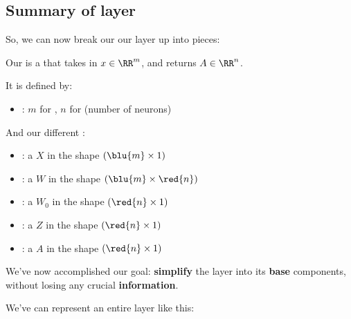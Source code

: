     \subsection{Summary of layer}
    
        So, we can now break our our layer up into pieces:\\
        
        \begin{notation}
            Our  is a  that takes in $x \in \RR^m$, and returns $A \in \RR^n$.
            
            It is defined by:
            
            \begin{itemize}
                \item {}: $m$ for , $n$ for  (number of neurons)
            \end{itemize}
            
            And our different :
            
            \begin{itemize}
                \item {}: a  $X$ in the shape $(\blu{m} \times 1)$
            
                \item {}: a  $W$ in the shape $(\blu{m} \times \red{n})$
                
                \item {}: a  $W_0$ in the shape $(\red{n} \times 1)$
                
                \item {}: a  $Z$ in the shape $(\red{n} \times 1)$
                
                \item {}: a  $A$ in the shape $(\red{n} \times 1)$
            \end{itemize}
        \end{notation}
        
        We've now accomplished our goal: \textbf{simplify} the layer into its \textbf{base} components, without losing any crucial \textbf{information}.
        
        We've can represent an entire layer like this:
        
